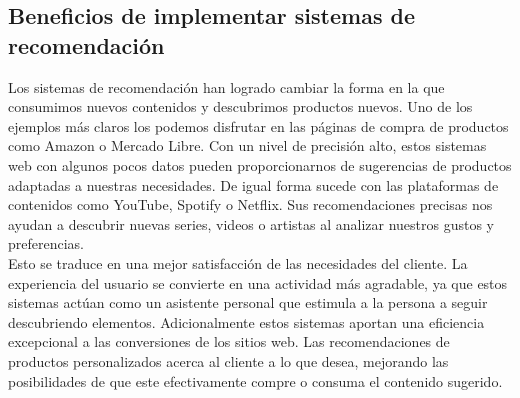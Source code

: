     \subsection{Beneficios de implementar sistemas de recomendación}
    Los sistemas de recomendación han logrado cambiar la forma en la que consumimos nuevos contenidos y descubrimos productos nuevos. Uno de los ejemplos más claros los podemos disfrutar en las páginas de compra de productos como Amazon o Mercado Libre. Con un nivel de precisión alto, estos sistemas web con algunos pocos datos pueden proporcionarnos de sugerencias de productos adaptadas a nuestras necesidades. De igual forma sucede con las plataformas de contenidos como YouTube, Spotify o Netflix. Sus recomendaciones precisas nos ayudan a descubrir nuevas series, videos o artistas al analizar nuestros gustos y preferencias.\\
    \newline
    Esto se traduce en una mejor satisfacción de las necesidades del cliente. La experiencia del usuario se convierte en una actividad más agradable, ya que estos sistemas actúan como un asistente personal que estimula a la persona a seguir descubriendo elementos. Adicionalmente estos sistemas aportan una eficiencia excepcional a las conversiones de los sitios web. Las recomendaciones de productos personalizados acerca al cliente a lo que desea, mejorando las posibilidades de que este efectivamente compre o consuma el contenido sugerido. \cite{mc6}
    
    
    
    